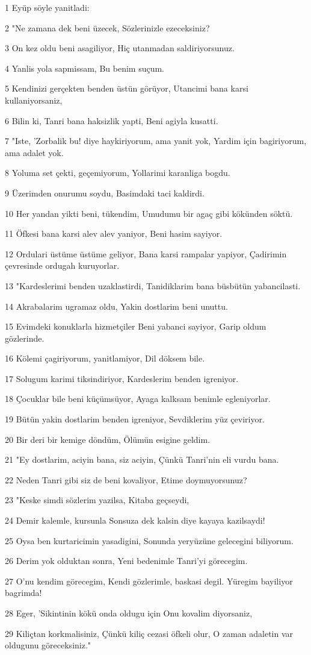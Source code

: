 \par 1 Eyüp söyle yanitladi:
\par 2 "Ne zamana dek beni üzecek, Sözlerinizle ezeceksiniz?
\par 3 On kez oldu beni asagiliyor, Hiç utanmadan saldiriyorsunuz.
\par 4 Yanlis yola sapmissam, Bu benim suçum.
\par 5 Kendinizi gerçekten benden üstün görüyor, Utancimi bana karsi kullaniyorsaniz,
\par 6 Bilin ki, Tanri bana haksizlik yapti, Beni agiyla kusatti.
\par 7 "Iste, 'Zorbalik bu! diye haykiriyorum, ama yanit yok, Yardim için bagiriyorum, ama adalet yok.
\par 8 Yoluma set çekti, geçemiyorum, Yollarimi karanliga bogdu.
\par 9 Üzerimden onurumu soydu, Basimdaki taci kaldirdi.
\par 10 Her yandan yikti beni, tükendim, Umudumu bir agaç gibi kökünden söktü.
\par 11 Öfkesi bana karsi alev alev yaniyor, Beni hasim sayiyor.
\par 12 Ordulari üstüme üstüme geliyor, Bana karsi rampalar yapiyor, Çadirimin çevresinde ordugah kuruyorlar.
\par 13 "Kardeslerimi benden uzaklastirdi, Tanidiklarim bana büsbütün yabancilasti.
\par 14 Akrabalarim ugramaz oldu, Yakin dostlarim beni unuttu.
\par 15 Evimdeki konuklarla hizmetçiler Beni yabanci sayiyor, Garip oldum gözlerinde.
\par 16 Kölemi çagiriyorum, yanitlamiyor, Dil döksem bile.
\par 17 Solugum karimi tiksindiriyor, Kardeslerim benden igreniyor.
\par 18 Çocuklar bile beni küçümsüyor, Ayaga kalksam benimle egleniyorlar.
\par 19 Bütün yakin dostlarim benden igreniyor, Sevdiklerim yüz çeviriyor.
\par 20 Bir deri bir kemige döndüm, Ölümün esigine geldim.
\par 21 "Ey dostlarim, aciyin bana, siz aciyin, Çünkü Tanri'nin eli vurdu bana.
\par 22 Neden Tanri gibi siz de beni kovaliyor, Etime doymuyorsunuz?
\par 23 "Keske simdi sözlerim yazilsa, Kitaba geçseydi,
\par 24 Demir kalemle, kursunla Sonsuza dek kalsin diye kayaya kazilsaydi!
\par 25 Oysa ben kurtaricimin yasadigini, Sonunda yeryüzüne gelecegini biliyorum.
\par 26 Derim yok olduktan sonra, Yeni bedenimle Tanri'yi görecegim.
\par 27 O'nu kendim görecegim, Kendi gözlerimle, baskasi degil. Yüregim bayiliyor bagrimda!
\par 28 Eger, 'Sikintinin kökü onda oldugu için Onu kovalim diyorsaniz,
\par 29 Kiliçtan korkmalisiniz, Çünkü kiliç cezasi öfkeli olur, O zaman adaletin var oldugunu göreceksiniz."

